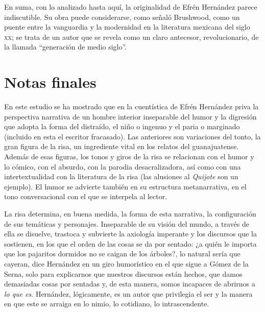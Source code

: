 \documentclass[14pt,twoside,final]{extbook} %
\begin{document}
En suma, con lo analizado hasta aquí, la originalidad de Efrén Hernández parece indiscutible. Su obra
puede considerarse, como señaló Brushwood, como un puente entre la vanguardia y la modernidad en la literatura mexicana del siglo \textsc{xx}; se trata de un autor que se revela como un claro antecesor, revolucionario, de la llamada ``generación de medio siglo''.
\chapter[\textsc{Notas finales}]{Notas finales}\label{ch:notas-finales}
\BgThispage
\thispagestyle{empty}
\pagestyle{fancy}
\fancyhf{} %
\fancyhead[RO,LE]{\thepage}
\renewcommand{\headrulewidth}{0pt}
\setcounter{page}{137}
En este estudio se ha mostrado que en la cuentística de Efrén Hernández priva la perspectiva narrativa de un hombre interior inseparable del humor y la digresión que adopta la forma del distraído, el niño o ingenuo y el paria o marginado (incluido en esta el escritor fracasado). Las anteriores son variaciones del tonto, la gran figura de la risa, un ingrediente vital en los relatos del guanajuatense. Además de esas figuras, los tonos y giros de la risa se relacionan con el humor y lo cómico, con el absurdo, con la parodia desacralizadora, así como con una intertextualidad con la literatura de la risa (las alusiones al \emph{Quijote} son un ejemplo). El humor se advierte también en su estructura metanarrativa, en el tono conversacional con el que se interpela al lector.

La risa determina, en buena medida, la forma de esta narrativa, la configuración de sus temáticas y personajes. Inseparable de su visión del mundo, a través de ella se disuelve, trastoca y subvierte la axiología imperante y los discursos que la sostienen, en los que el orden de las cosas se da por sentado: ¿a quién le importa que los pajaritos dormidos no se caigan de los árboles?, lo natural sería que cayeran, dice Hernández en un giro humorístico en el que sigue a Gómez de la Serna, solo para explicarnos que nuestros discursos están hechos, que damos demasiadas cosas por sentadas y, de esta manera, somos incapaces de abrirnos a \emph{lo que es}. Hernández, lógicamente, es un autor que privilegia el ser y la manera en que este se arraiga en lo nimio, lo cotidiano, lo intrascendente.
\end{document}

